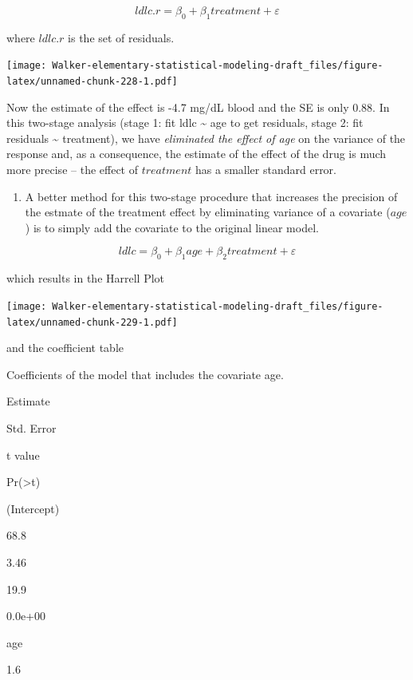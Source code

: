\documentclass[]{book}
\providecommand{\tightlist}{%
  \setlength{\itemsep}{0pt}\setlength{\parskip}{0pt}}
\begin{document}
\begin{equation}
ldlc.r = \beta_0 + \beta_1 treatment + \varepsilon
\label{eq:ancova-3}
\end{equation}

where \(ldlc.r\) is the set of residuals.

\texttt{[image: Walker-elementary-statistical-modeling-draft\_files/figure-latex/unnamed-chunk-228-1.pdf]}

Now the estimate of the effect is -4.7 mg/dL blood and the SE is only 0.88. In this two-stage analysis (stage 1: fit ldlc \textasciitilde{} age to get residuals, stage 2: fit residuals \textasciitilde{} treatment), we have \emph{eliminated the effect of age} on the variance of the response and, as a consequence, the estimate of the effect of the drug is much more precise -- the effect of \(treatment\) has a smaller standard error.

\begin{enumerate}
\def\labelenumi{\arabic{enumi}.}
\setcounter{enumi}{2}
\tightlist
\item
  A better method for this two-stage procedure that increases the precision of the estmate of the treatment effect by eliminating variance of a covariate (\(age\)) is to simply add the covariate to the original linear model.
\end{enumerate}

\begin{equation}
ldlc = \beta_0 + \beta_1 age + \beta_2 treatment + \varepsilon
\label{eq:cov-cov}
\end{equation}

which results in the Harrell Plot

\texttt{[image: Walker-elementary-statistical-modeling-draft\_files/figure-latex/unnamed-chunk-229-1.pdf]}

and the coefficient table

\label{tab:unnamed-chunk-230}Coefficients of the model that includes the covariate age.

Estimate

Std. Error

t value

Pr(\textgreater\textbar t\textbar)

(Intercept)

68.8

3.46

19.9

0.0e+00

age

1.6
\end{document}
